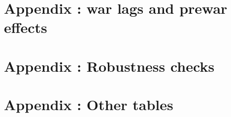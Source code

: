 \documentclass[12pt,a4paper,titlepage,english]{article}
\begin{document}
\clearpage
\appendix
\section{Appendix : war lags and prewar effects}






\clearpage




\clearpage
\section{Appendix : Robustness checks}










\clearpage
\section{Appendix : Other tables}


\end{document}
